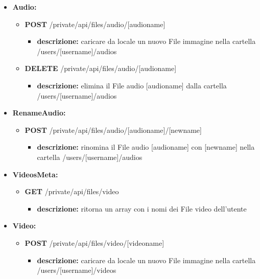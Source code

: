 {\begin{itemize}
		\item \textbf{Audio:}
			\begin{itemize}
			\item    \textbf{POST} /private/api/files/audio/[audioname]
				\begin{itemize} 
				\item \textbf{descrizione:} caricare da locale un nuovo File immagine nella cartella /users/[username]/audios					

				\end{itemize}
			\item   \textbf{DELETE} /private/api/files/audio/[audioname]
				\begin{itemize} 
				\item \textbf{descrizione:} elimina il File audio [audioname] dalla cartella /users/[username]/audios			

				\end{itemize}
			\end{itemize}
			
		\item \textbf{RenameAudio:}
			\begin{itemize}
			\item   \textbf{POST} /private/api/files/audio/[audioname]/[newname] 
				\begin{itemize} 
				\item \textbf{descrizione:} rinomina il File audio [audioname] con [newname] nella cartella /users/[username]/audios

				\end{itemize}
			\end{itemize}
						
		\item \textbf{VideosMeta:}
			\begin{itemize}
			\item   \textbf{GET} /private/api/files/video
				\begin{itemize} 
				\item \textbf{descrizione:} ritorna un array con i nomi dei File video dell'utente
	
				\end{itemize}
			\end{itemize}
			
		\item \textbf{Video:}
			\begin{itemize}
			
			\item    \textbf{POST} /private/api/files/video/[videoname]
				\begin{itemize} 
				\item \textbf{descrizione:} caricare da locale un nuovo File immagine nella cartella /users/[username]/videos					


\end{itemize}
\end{itemize}
\end{itemize}}
